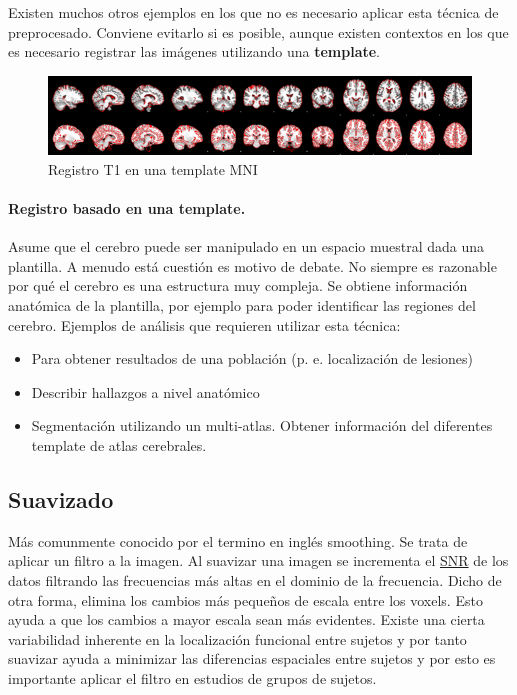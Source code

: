 Existen muchos otros ejemplos en los que no es necesario aplicar esta técnica de preprocesado. Conviene evitarlo si es posible, aunque existen contextos en los que es necesario registrar las imágenes utilizando una \textbf{template}.

\begin{figure}[H]
  \centering
    \includegraphics[scale=0.75]{img/highres2mni.png}
  \caption{ Registro T1 en una template MNI}         \label{preproc:highres2mni}
\end{figure}

\paragraph{ Registro basado en una template.} Asume que el cerebro puede ser manipulado en un espacio muestral dada una plantilla. A menudo está cuestión es motivo de debate. No siempre es razonable por qué el cerebro es una estructura muy compleja.
Se obtiene información anatómica de la plantilla, por ejemplo para poder identificar las regiones del cerebro.
Ejemplos de análisis que requieren utilizar esta técnica:
\begin{itemize}
	\item Para obtener resultados de una población (p. e. localización de lesiones)
	\item Describir hallazgos a nivel anatómico
	\item Segmentación utilizando un multi-atlas. Obtener información del diferentes template de atlas cerebrales.
\end{itemize}

\subsection{Suavizado}

Más comunmente conocido por el termino en inglés smoothing. Se trata de aplicar un filtro a la imagen. Al suavizar una imagen se incrementa el \hyperref[glos:snr]{SNR} de los datos filtrando las frecuencias más altas en el dominio de la frecuencia. Dicho de otra forma, elimina los cambios más pequeños de escala entre los voxels. Esto ayuda a que los cambios a mayor escala sean más evidentes. 
Existe una cierta variabilidad inherente en la localización funcional entre sujetos y por tanto suavizar ayuda a minimizar las diferencias espaciales entre sujetos y por esto es importante aplicar el filtro en estudios de grupos de sujetos. \\

